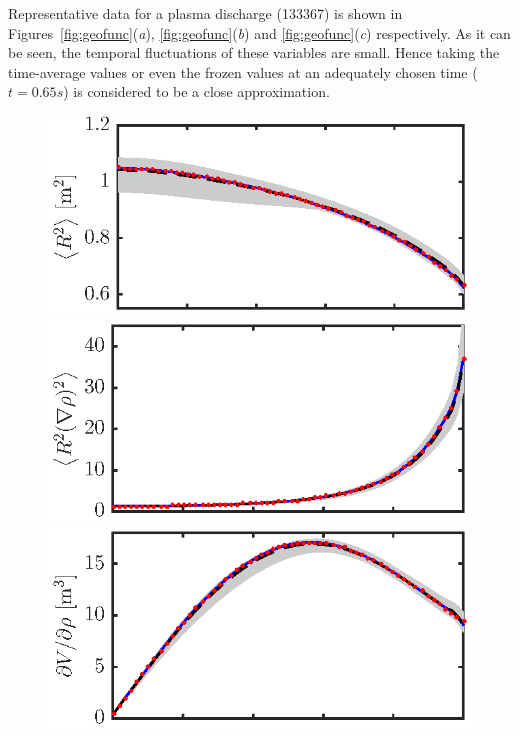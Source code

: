 \documentclass[12pt]{iopart}
\begin{document}
Representative data for a plasma discharge (133367) is shown in Figures~\ref{fig:geofunc}(\emph{a}), \ref{fig:geofunc}(\emph{b}) and \ref{fig:geofunc}(\emph{c}) respectively.  As it can be seen, the temporal fluctuations of these variables are small. Hence taking the time-average values or even the frozen values at an adequately chosen time ($t = 0.65 s$) is considered to be a close approximation. 
\begin{figure} 
\includegraphics{imene_figs/fig1a} \hspace{-3em} \\
\includegraphics{imene_figs/fig1b} \hspace{-3em} \\
\includegraphics{imene_figs/fig1c} \hspace{-3em} \\[-.4em]

\end{figure}
\end{document}
